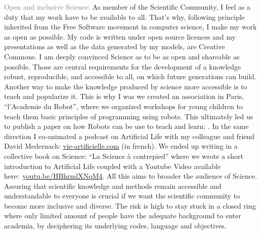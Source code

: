 \documentclass[10pt]{article}
\begin{document}


\textcolor{grey}{Open and inclusive Science:} As member of the Scientific Community, I feel as a duty that my work have to be available to all. That's why, following principle inherited from the Free Software movement in computer science, I make my work as open as possible. My code is written under open source licences and my presentations as well as the data generated by my models, are Creative Commons. I am deeply convinced Science as to be as open and shareable as possible. Those  are central requirements for the development of a knowledge robust, reproducible, and accessible to all, on which future generations can build. 
Another way to make the knowledge produced by science more accessible is to teach and popularize it. This is why I was we created an association in Paris, ``l'Academie du Robot'', where we organized workshops for young children to teach them basic principles of programming using robots. This ultimately led us to publish a paper on how Robots can be use to teach and learn: \cite{gaudiello2010representations}. In the same direction I co-animated a podcast on Artificial Life with my colleague and friend David Medernach: \href{http://vie-artificielle.com/}{vie-artificielle.com} (in french). We ended up writing in a collective book on Science: ``La Science \`a  contrepied''\cite{collectif2017science} where we wrote a short introduction to Artificial Life coupled with a Youtube Video available here:~\href{https://www.youtube.com/watch?v=HBhrmlXNqM4}{youtu.be/HBhrmlXNqM4}. 
All this aims to broader the audience of Science. Assuring that scientific knowledge and methods remain accessible and understandable to everyone is crucial if we want the scientific community to become more inclusive and diverse. The risk is high to stay stuck in a closed ring where only limited amount of people have the adequate background to enter academia, by deciphering its underlying codes, language and objectives.




                   
\end{document}
